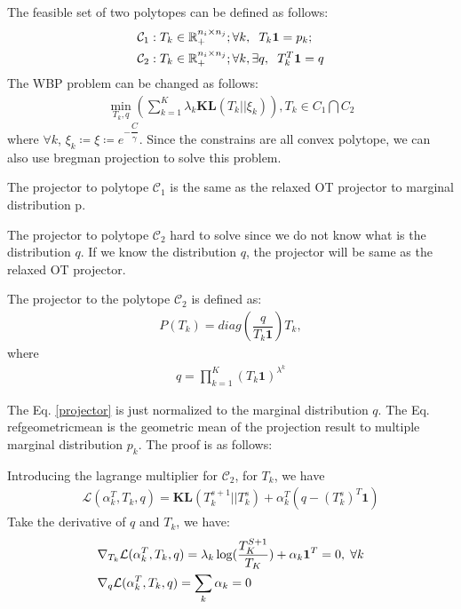 \documentclass{article}
\theoremstyle{plain}
\theoremstyle{definition}
\begin{document}
The feasible set of two polytopes can be defined as follows:
\begin{align}
&\mathcal{C}_{1}: {T_{k} \in \mathbb{R}_{+}^{n_{i} \times n_{j}}}; \forall k, \hspace{2mm}T_{k}\mathbf{1} = p_{k};  \\
&\mathcal{C}_{2}: {T_{k} \in \mathbb{R}_{+}^{n_{i} \times n_{j}}}; \forall k, \exists q, \hspace{2mm} T_{k}^{T}\mathbf{1} = q \label{WBPpolytope}
\end{align}
The WBP problem can be changed as follows:
\begin{align}
\min_{T_{k},q} \left(\sum_{k=1}^{K}\lambda_{k}\mathbf{KL}(T_{k}||\xi_{k})\right), T_{k} \in C_{1} \bigcap C_{2}
\end{align}
where $\forall k$, $\xi_{k} \coloneqq \xi \coloneqq e^{-\dfrac{C}{\gamma}}$.
Since the constrains are all convex polytope, we can also use bregman projection to solve this problem.

The projector to polytope $\mathcal{C}_{1}$ is the same as the relaxed OT projector to marginal distribution p.

The projector to polytope $\mathcal{C}_{2}$ hard to solve since we do not know what is the distribution $q$. If we know the distribution $q$, the projector will be same as the relaxed OT projector.

The projector to the polytope $\mathcal{C}_{2}$ is defined as:
\begin{align}
P(T_{k}) = diag(\dfrac{q}{T_{k}\mathbf{1}})T_{k}, \label{WBPprojector}
\end{align}
where 
\begin{align}
q = \prod_{k=1}^{K}(T_{k}\mathbf{1})^{\lambda^{k}} \label{geometricmean}
\end{align}

The Eq. \ref{projector} is just normalized to the marginal distribution $q$. The Eq. ref{geometricmean} is the geometric mean of the projection result to multiple marginal distribution $p_{k}$. The proof is as follows:

Introducing the lagrange multiplier for $\mathcal{C}_{2}$, for $T_{k}$, we have
\begin{align}
\mathcal{L}(\alpha_{k}^{T},T_{k},q) = \mathbf{KL}(T_{k}^{s+1}||T_{k}^{s}) + \alpha_{k}^{T}(q-(T_{k}^{s})^{T}\mathbf{1})
\end{align}
Take the derivative of $q$ and $T_{k}$, we have:
\begin{align}
&\nabla_{T_{k}} \mathcal{L}(\alpha_{k}^{T},T_{k},q) = \lambda_{k}\log(\dfrac{T_{K}^{S+1}}{T_{K}}) + \alpha_{k}\mathbf{1}^{T} = 0, \hspace{1mm} \forall k\\ 
&\nabla_{q} \mathcal{L}(\alpha_{k}^{T},T_{k},q) = \sum_{k}\alpha_{k} = 0 \label{firstorder}
\end{align}
\end{document}
